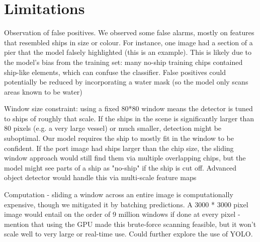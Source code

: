 \documentclass[11pt]{article}
\begin{document}
	
	
	
	\section*{Limitations}
	
	Observation of false positives. We observed some false alarms, mostly on features that resembled ships in size or colour. For instance, one image had a section of a pier that the model falsely highlighted (this is an example). This is likely due to the model's bias from the training set: many no-ship training chips contained ship-like elements, which can confuse the classifier.
	False positives could potentially be reduced by incorporating a water mask (so the model only scans areas known to be water)
	
	Window size constraint: using a fixed 80*80 window means the detector is tuned to ships of roughly that scale. If the ships in the scene is significantly larger than 80 pixels (e.g. a very large vessel) or much smaller, detection might be suboptimal. Our model requires the ship to mostly fit in the window to be confident. If the port image had ships larger than the chip size, the sliding window approach would still find them via multiple overlapping chips, but the model might see parts of a ship as "no-ship" if the ship is cut off. Advanced object detector would handle this via multi-scale feature maps
	
	Computation - sliding a window across an entire image is computationally expensive, though we mitigated it by batching predictions. A 3000 * 3000 pixel image would entail on the order of 9 million windows if done at every pixel - mention that using the GPU made this brute-force scanning feasible, but it won't scale well to very large or real-time use. Could further explore the use of YOLO.
	
\end{document}
